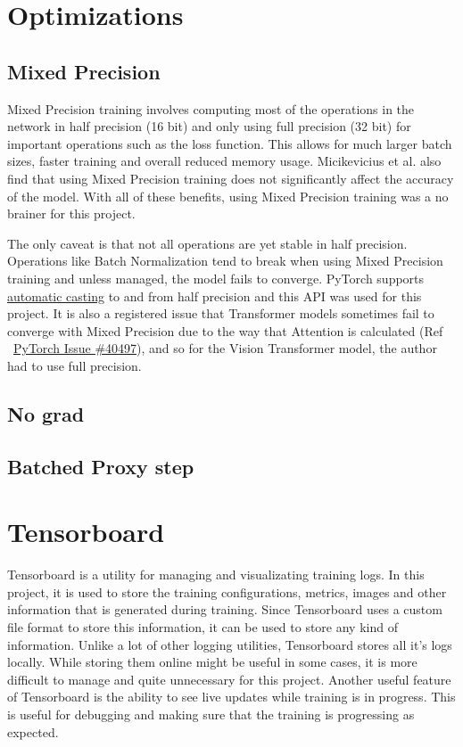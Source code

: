 \section{Optimizations}
\subsection{Mixed Precision}
Mixed Precision training \cite{micikeviciusMixedPrecisionTraining2017} involves computing most of the operations in the network in half precision (16 bit) and only using full precision (32 bit) for important operations such as the loss function. This allows for much larger batch sizes, faster training and overall reduced memory usage. Micikevicius et al. also find that using Mixed Precision training does not significantly affect the accuracy of the model. With all of these benefits, using Mixed Precision training was a no brainer for this project.

The only caveat is that not all operations are yet stable in half precision. Operations like Batch Normalization tend to break when using Mixed Precision training and unless managed, the model fails to converge. PyTorch supports \href{https://pytorch.org/docs/stable/notes/amp_examples.html}{automatic casting} to and from half precision and this API was used for this project. It is also a registered issue that Transformer models sometimes fail to converge with Mixed Precision due to the way that Attention is calculated (Ref ~\href{https://github.com/pytorch/pytorch/issues/40497}{PyTorch Issue \#40497}), and so for the Vision Transformer \cite{dosovitskiyImageWorth16x162021} model, the author had to use full precision.
\subsection{No grad}
\subsection{Batched Proxy step}

\section{Tensorboard}
Tensorboard is a utility for managing and visualizating training logs. In this project, it is used to store the training configurations, metrics, images and other information that is generated during training. Since Tensorboard uses a custom file format to store this information, it can be used to store any kind of information. Unlike a lot of other logging utilities, Tensorboard stores all it's logs locally. While storing them online might be useful in some cases, it is more difficult to manage and quite unnecessary for this project. 
Another useful feature of Tensorboard is the ability to see live updates while training is in progress. This is useful for debugging and making sure that the training is progressing as expected.


